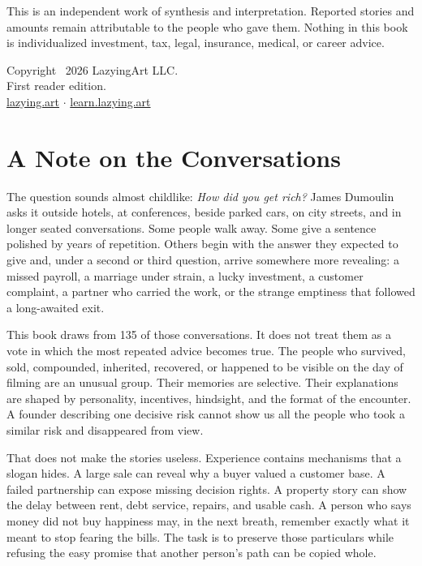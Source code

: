 This is an independent work of synthesis and interpretation. Reported stories
and amounts remain attributable to the people who gave them. Nothing in this
book is individualized investment, tax, legal, insurance, medical, or career
advice.

\vfill

{\small
Copyright \textcopyright\ 2026 LazyingArt LLC.\\
First reader edition.\\
\href{https://lazying.art}{lazying.art} $\boldsymbol{\cdot}$
\href{https://learn.lazying.art}{learn.lazying.art}
\par}

\cleardoublepage
\chapter*{A Note on the Conversations}

The question sounds almost childlike: \emph{How did you get rich?} James
Dumoulin asks it outside hotels, at conferences, beside parked cars, on city
streets, and in longer seated conversations. Some people walk away. Some give a
sentence polished by years of repetition. Others begin with the answer they
expected to give and, under a second or third question, arrive somewhere more
revealing: a missed payroll, a marriage under strain, a lucky investment, a
customer complaint, a partner who carried the work, or the strange emptiness
that followed a long-awaited exit.

This book draws from 135 of those conversations. It does not treat them as a
vote in which the most repeated advice becomes true. The people who survived,
sold, compounded, inherited, recovered, or happened to be visible on the day of
filming are an unusual group. Their memories are selective. Their explanations
are shaped by personality, incentives, hindsight, and the format of the
encounter. A founder describing one decisive risk cannot show us all the people
who took a similar risk and disappeared from view.

That does not make the stories useless. Experience contains mechanisms that a
slogan hides. A large sale can reveal why a buyer valued a customer base. A
failed partnership can expose missing decision rights. A property story can
show the delay between rent, debt service, repairs, and usable cash. A person
who says money did not buy happiness may, in the next breath, remember exactly
what it meant to stop fearing the bills. The task is to preserve those
particulars while refusing the easy promise that another person's path can be
copied whole.

